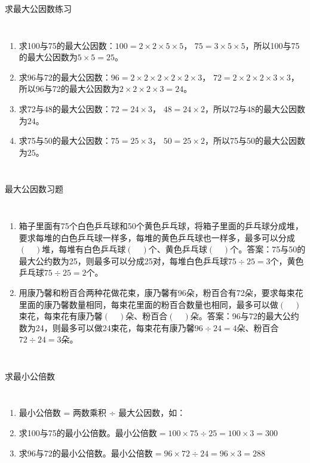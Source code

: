 \documentclass[aspectratio=169]{ctexbeamer} %
\begin{document}
\begin{frame}[t]{求最大公因数练习}
\begin{columns}
\begin{enumerate}[label={\arabic*.}]
\item 求100与75的最大公因数：\pause $100 = 2 \times 2 \times 5 \times 5$， $75 = 3 \times 5 \times 5$，所以100与75的最大公因数为$5 \times 5 = 25$。
\item 求96与72的最大公因数：\pause $96 = 2 \times 2 \times 2 \times 2 \times 2 \times 3$， $72 = 2 \times 2 \times 2 \times 3 \times 3$，所以96与72的最大公因数为$2 \times 2 \times 2 \times 3  = 24$。
\item 求72与48的最大公因数：\pause $72 = 24 \times 3$， $48 = 24 \times 2$，所以72与48的最大公因数为$24$。
\item 求75与50的最大公因数：\pause $75 = 25 \times 3$， $50 = 25 \times 2$，所以75与50的最大公因数为$25$。
\end{enumerate}
\end{columns}
\end{frame}

\begin{frame}[t]{最大公因数习题}
\begin{columns}
\begin{enumerate}[label={\arabic*.}]
\item 箱子里面有75个白色乒乓球和50个黄色乒乓球，将箱子里面的乒乓球分成堆，要求每堆的白色乒乓球一样多，每堆的黄色乒乓球也一样多，最多可以分成$(\quad)$堆，每堆有白色乒乓球$(\quad)$个、黄色乒乓球$(\quad)$个。\pause \alert{答案：75与50的最大公约数为25，则最多可以分成25对，每堆白色乒乓球$75 \div 25 = 3$个，黄色乒乓球$75 \div 25 = 2$个。}
\item 用康乃馨和粉百合两种花做花束，康乃馨有96朵，粉百合有72朵，要求每束花里面的康乃馨数量相同，每束花里面的粉百合数量也相同，最多可以做$(\quad)$束花，每束花有康乃馨$(\quad)$朵、粉百合$(\quad)$朵。\pause \alert{答案：96与72的最大公约数为24，则最多可以做24束花，每束花有康乃馨$96 \div 24 = 4$朵、粉百合$72 \div 24 = 3$朵。}
\end{enumerate}
\end{columns}
\end{frame}

\begin{frame}[t]{求最小公倍数}
\begin{columns}
\begin{enumerate}[label={\arabic*.}]
\item 最小公倍数 = 两数乘积 ÷ 最大公因数，如：
\item 求100与75的最小公倍数。\pause 最小公倍数$ = 100 \times 75 \div 25 = 100 \times 3 = 300$
\item 求96与72的最小公倍数。\pause 最小公倍数$ = 96 \times 72 \div 24 = 96 \times 3 = 288$
\end{enumerate}
\end{columns}
\end{frame}
\end{document}
